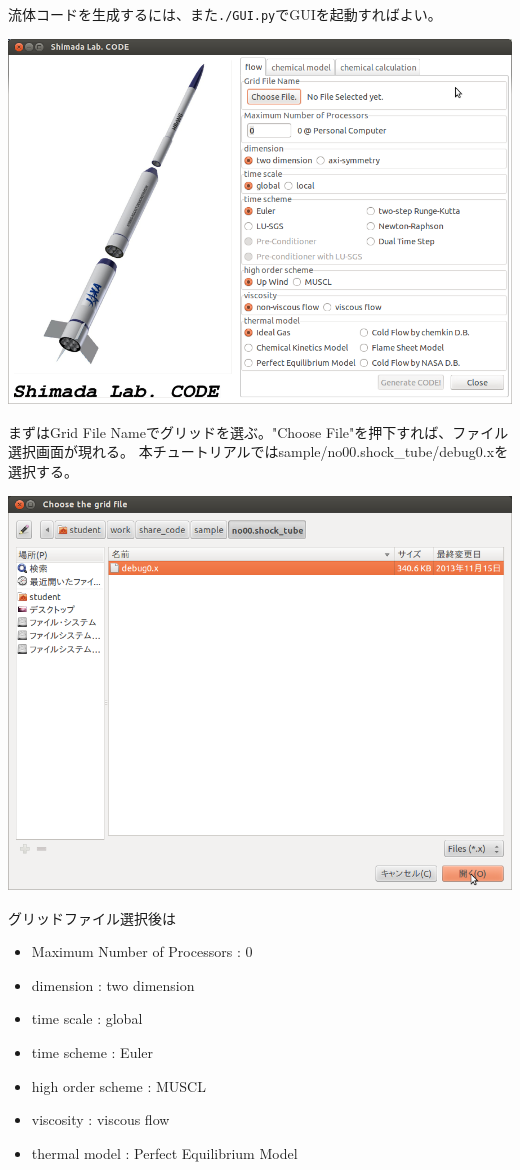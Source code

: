 \documentclass{jsarticle}
\begin{document}
流体コードを生成するには、また\verb|./GUI.py|でGUIを起動すればよい。
\begin{center}
\includegraphics[width=.8\textwidth,bb=0 0 895 649]{tutorial_img/130.png}
\end{center}
まずはGrid File Nameでグリッドを選ぶ。"Choose File"を押下すれば、ファイル選択画面が現れる。
本チュートリアルではsample/no00.shock\_tube/debug0.xを選択する。
\begin{center}
\includegraphics[width=.8\textwidth,bb=0 0 842 659]{tutorial_img/140.png}
\end{center}
グリッドファイル選択後は
\begin{itemize}
\item Maximum Number of Processors : 0
\item dimension : two dimension
\item time scale : global
\item time scheme : Euler
\item high order scheme : MUSCL
\item viscosity : viscous flow
\item thermal model : Perfect Equilibrium Model
\end{itemize}
\end{document}
